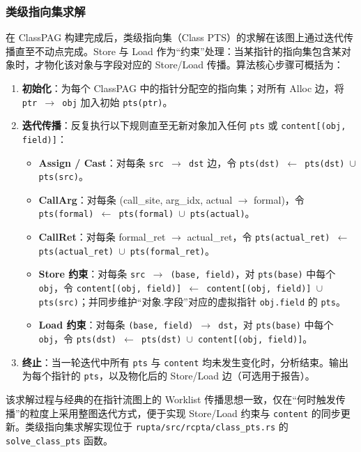 \subsubsection{\heiti 类级指向集求解}

在 ClassPAG 构建完成后，类级指向集（Class PTS）的求解在该图上通过迭代传播直至不动点完成。Store 与 Load 作为“约束”处理：当某指针的指向集包含某对象时，才物化该对象与字段对应的 Store/Load 传播。算法核心步骤可概括为：

\begin{enumerate}
    \item \textbf{初始化}：为每个 ClassPAG 中的指针分配空的指向集；对所有 Alloc 边，将 \texttt{ptr $\to$ obj} 加入初始 \texttt{pts(ptr)}。
    \item \textbf{迭代传播}：反复执行以下规则直至无新对象加入任何 \texttt{pts} 或 \texttt{content[(obj, field)]}：
    \begin{itemize}
        \item \textbf{Assign / Cast}：对每条 \texttt{src $\to$ dst} 边，令 \texttt{pts(dst) $\gets$ pts(dst) $\cup$ pts(src)}。
        \item \textbf{CallArg}：对每条 (call\_site, arg\_idx, actual $\to$ formal)，令 \texttt{pts(formal) $\gets$ pts(formal) $\cup$ pts(actual)}。
        \item \textbf{CallRet}：对每条 formal\_ret $\to$ actual\_ret，令 \texttt{pts(actual\_ret) $\gets$ pts(actual\_ret) $\cup$ pts(formal\_ret)}。
        \item \textbf{Store 约束}：对每条 \texttt{src $\to$ (base, field)}，对 \texttt{pts(base)} 中每个 \texttt{obj}，令 \texttt{content[(obj, field)] $\gets$ content[(obj, field)] $\cup$ pts(src)}；并同步维护“对象.字段”对应的虚拟指针 \texttt{obj.field} 的 \texttt{pts}。
        \item \textbf{Load 约束}：对每条 \texttt{(base, field) $\to$ dst}，对 \texttt{pts(base)} 中每个 \texttt{obj}，令 \texttt{pts(dst) $\gets$ pts(dst) $\cup$ content[(obj, field)]}。
    \end{itemize}
    \item \textbf{终止}：当一轮迭代中所有 \texttt{pts} 与 \texttt{content} 均未发生变化时，分析结束。输出为每个指针的 \texttt{pts}，以及物化后的 Store/Load 边（可选用于报告）。
\end{enumerate}

该求解过程与经典的在指针流图上的 Worklist 传播思想一致，仅在“何时触发传播”的粒度上采用整图迭代方式，便于实现 Store/Load 约束与 \texttt{content} 的同步更新。类级指向集求解实现位于 \texttt{rupta/src/rcpta/class\_pts.rs} 的 \texttt{solve\_class\_pts} 函数。

